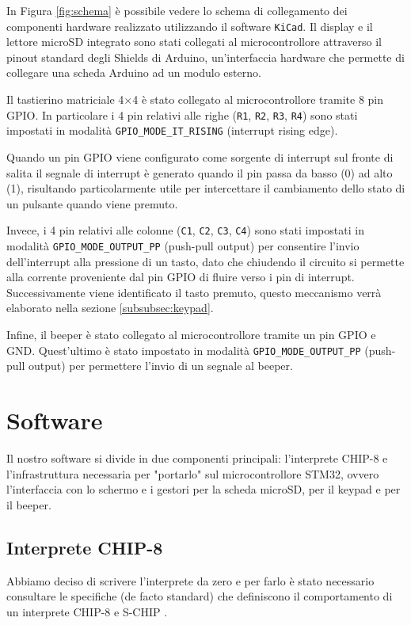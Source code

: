 \documentclass[a4paper]{article}
\begin{document}
In Figura \ref{fig:schema} è possibile vedere lo schema di collegamento
dei componenti hardware realizzato utilizzando il software \texttt{KiCad}.
Il display e il lettore microSD integrato sono stati collegati al microcontrollore
attraverso il pinout standard degli Shields di Arduino, un'interfaccia hardware che permette
di collegare una scheda Arduino ad un modulo esterno.

Il tastierino matriciale 4$\times$4 è stato collegato al microcontrollore tramite 8 pin GPIO.
In particolare i 4 pin relativi alle righe (\texttt{R1}, \texttt{R2}, \texttt{R3}, \texttt{R4})
sono stati impostati in modalità \texttt{GPIO\_MODE\_IT\_RISING} (interrupt rising edge).

Quando un pin GPIO viene configurato come sorgente di interrupt sul fronte di salita
il segnale di interrupt è generato quando il pin passa da basso (0) ad alto (1), risultando
particolarmente utile per intercettare il cambiamento dello stato di un
pulsante quando viene premuto.

Invece, i 4 pin relativi alle colonne (\texttt{C1}, \texttt{C2}, \texttt{C3}, \texttt{C4})
sono stati impostati in modalità \texttt{GPIO\_MODE\_OUTPUT\_PP} (push-pull output) per
consentire l'invio dell'interrupt alla pressione di un tasto, dato che chiudendo il circuito
si permette alla corrente proveniente dal pin GPIO di fluire verso i pin di interrupt.
Successivamente viene identificato il tasto premuto, questo meccanismo verrà elaborato
nella sezione \ref{subsubsec:keypad}.

Infine, il beeper è stato collegato al microcontrollore tramite un pin GPIO e GND.
Quest'ultimo è stato impostato in modalità \texttt{GPIO\_MODE\_OUTPUT\_PP} (push-pull output)
per permettere l'invio di un segnale al beeper.

\section{Software}

Il nostro software si divide in due componenti principali: l'interprete CHIP-8 e
l'infrastruttura necessaria per "portarlo" sul microcontrollore STM32, ovvero l'interfaccia
con lo schermo e i gestori per la scheda microSD, per il keypad e per il beeper.

\subsection{Interprete CHIP-8}

Abbiamo deciso di scrivere l'interprete da zero e per farlo è stato necessario consultare
le specifiche (de facto standard) che definiscono il comportamento di un interprete CHIP-8
\cite{cowgod:chip8} e S-CHIP \cite{cowgod:schip}.
\end{document}
